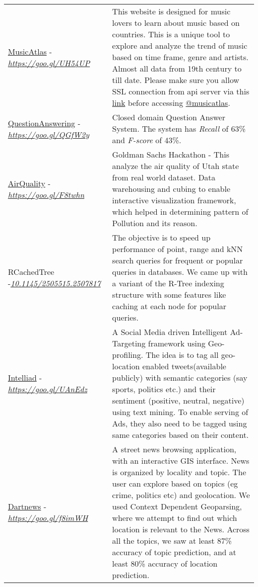 \documentclass[8pt]{article}
\begin{document}
\begin{tabular}[t]{@{}p{\textwidth-\rcollength-180pt}p{\rcollength+180pt}}
        \href{https://musicatlas.github.io/}{MusicAtlas} -\href{https://goo.gl/UH54UP}{\textit{https://goo.gl/UH54UP}} & \hspace{0.5cm}  This website is designed for music lovers to learn about music based on countries. This is a unique tool to explore and analyze the trend of music based on time frame, genre and artists. Almost all data from 19th century to till date. Please make sure you allow SSL connection from api server via this \href{https://db03.cs.utah.edu:8181/api/country_track}{link} before accessing \href{https://musicatlas.github.io/musicatlas/}{@musicatlas}.\\[0.1cm]
        \href{https://github.com/debjyoti385/QuestionAnswerNLP}{QuestionAnswering} -\href{https://goo.gl/QGfW2y}{\textit{https://goo.gl/QGfW2y}} & \hspace{0.5cm}  Closed domain Question Answer System. The system has \emph{Recall} of  63\% and \emph{F-score} of 43\%.   \\[0.1cm]
        \href{http://debjyoti385.github.io/AirQuality/}{AirQuality} -\href{https://goo.gl/F8twhn}{\textit{https://goo.gl/F8twhn}}  & \hspace{0.5cm}  Goldman Sachs Hackathon - This analyze the air quality of Utah state from real world dataset. Data warehousing and cubing to enable interactive visualization framework, which helped in determining pattern of Pollution and its reason. \\
        RCachedTree -\href{https://doi.org/10.1145/2505515.2507817}{\textit{10.1145/2505515.2507817}} & \hspace{0.5cm}  The objective is to speed up performance of point, range and kNN search queries for frequent or popular queries in databases. We came up with a variant of the R-Tree indexing structure with some features like caching at each node for popular queries.\\ 
        \href{http://github.com/debjyoti385/intelliad}{Intelliad} -\href{https://goo.gl/UAnEdz}{\textit{https://goo.gl/UAnEdz}} & \hspace{0.5cm} A Social Media driven Intelligent Ad-Targeting framework using Geo-profiling. The idea is to tag all geo-location enabled tweets(available publicly) with semantic categories (say sports, politics etc.) and their sentiment (positive, neutral, negative) using text mining. To enable serving of Ads, they also need to be tagged using same categories based on their content. \\
        \href{http://github.com/debjyoti385/dartnews}{Dartnews} -\href{https://goo.gl/f8imWH}{\textit{https://goo.gl/f8imWH}}  & \hspace{0.5cm} A street news browsing application, with an interactive GIS interface. News is organized by locality and topic. The user can explore based on topics (eg crime, politics etc) and geolocation. We used Context Dependent Geoparsing, where we attempt to find out which location is relevant to the News. Across all the topics, we saw at least 87\% accuracy of topic prediction, and at least 80\% accuracy of location prediction.\\

\end{tabular}
\end{document}
